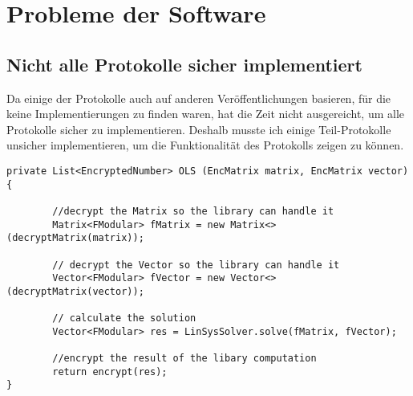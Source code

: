 \chapter{Probleme der Software}

\section{Nicht alle Protokolle sicher implementiert}
Da einige der Protokolle auch auf anderen Veröffentlichungen basieren, für die keine Implementierungen zu finden waren, hat die Zeit nicht ausgereicht, um alle Protokolle sicher zu implementieren. Deshalb musste ich einige Teil-Protokolle unsicher implementieren, um die Funktionalität des Protokolls zeigen zu können.\\

\begin{lstlisting}[caption = Ausschnitt aus unsicherer Implementierung von OLS (vereinfacht), label = {Code:OLS}]
private List<EncryptedNumber> OLS (EncMatrix matrix, EncMatrix vector){

		//decrypt the Matrix so the library can handle it
        Matrix<FModular> fMatrix = new Matrix<>(decryptMatrix(matrix));

        // decrypt the Vector so the library can handle it
        Vector<FModular> fVector = new Vector<>(decryptMatrix(vector));

        // calculate the solution
        Vector<FModular> res = LinSysSolver.solve(fMatrix, fVector);
        
        //encrypt the result of the libary computation
        return encrypt(res);
}
\end{lstlisting}

